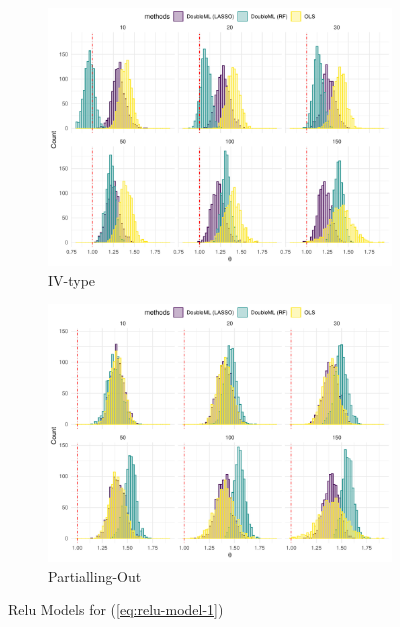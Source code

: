 \documentclass[en,12pt,mtpro2]{elegantpaper}
\begin{document}
\begin{figure}[htp]
    \centering
    \begin{subfigure}{.41\textwidth}
        \centering
        \includegraphics[width=\linewidth]{figures/simulation-relu3 (IV-type).pdf}
        \caption{IV-type}
    \end{subfigure}
    \begin{subfigure}{.41\textwidth}
        \centering
        \includegraphics[width=\linewidth]{figures/simulation-relu3 (partialling out).pdf}
        \caption{Partialling-Out}
    \end{subfigure}
    \caption{Relu Models for (\ref{eq:relu-model-1})}
\end{figure}
\end{document}
